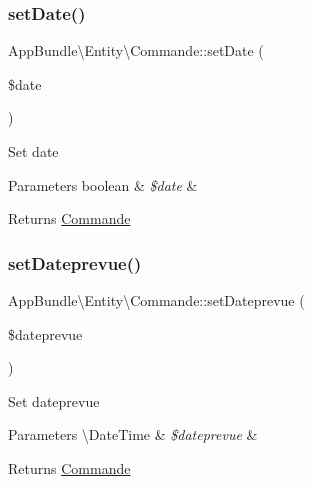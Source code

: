 \subsubsection{\texorpdfstring{set\+Date()}{setDate()}}
{\footnotesize\ttfamily App\+Bundle\textbackslash{}\+Entity\textbackslash{}\+Commande\+::set\+Date (\begin{DoxyParamCaption}\item[{}]{\$date }\end{DoxyParamCaption})}

Set date


\begin{DoxyParams}[1]{Parameters}
boolean & {\em \$date} & \\
\hline
\end{DoxyParams}
\begin{DoxyReturn}{Returns}
\hyperlink{class_app_bundle_1_1_entity_1_1_commande}{Commande} 
\end{DoxyReturn}
\mbox{\label{class_app_bundle_1_1_entity_1_1_commande_a2df21c904c78ee7eae998aba3a7c1ab9}} 
\subsubsection{\texorpdfstring{set\+Dateprevue()}{setDateprevue()}}
{\footnotesize\ttfamily App\+Bundle\textbackslash{}\+Entity\textbackslash{}\+Commande\+::set\+Dateprevue (\begin{DoxyParamCaption}\item[{}]{\$dateprevue }\end{DoxyParamCaption})}

Set dateprevue


\begin{DoxyParams}[1]{Parameters}
\textbackslash{}\+Date\+Time & {\em \$dateprevue} & \\
\hline
\end{DoxyParams}
\begin{DoxyReturn}{Returns}
\hyperlink{class_app_bundle_1_1_entity_1_1_commande}{Commande} 
\end{DoxyReturn}
\mbox{\label{class_app_bundle_1_1_entity_1_1_commande_ad123fe4490903de722cb787ff6b5dc86}} 
